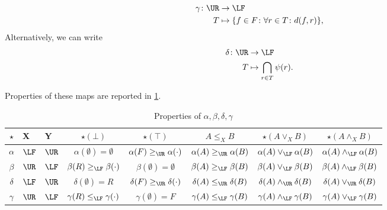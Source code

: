 \begin{equation}
\label{eq:galoisgamma}
    \begin{aligned}
    \gamma \colon \UR&\to \LF\\
    T&\mapsto \{f\in F \colon \forall {r\in T}\colon d(f,r)\},
    \end{aligned}
\end{equation}
Alternatively, we can write
\begin{equation}
    \begin{aligned}
    \delta\colon \UR &\to \LF\\
    T&\mapsto \bigcap_{r\in T}\psi(r).
    \end{aligned}
\end{equation}

\noindent Properties of these maps are reported in \cref{tab:galoisproperties}.


\begin{table}[h!]
    \begin{center}
    \begin{tabular}{c|l|l|c|c|c|c|c}
         $\star$&X&Y&$\star(\bot)$&$\star(\top)$&$A\leq_X B$ &$\star(A\vee_X B)$&$\star(A\wedge_X B)$\\
         \hline
         $\alpha$&$\LF$&$\UR$&$\alpha(\emptyset)=\emptyset$&$\alpha(F)\geq_{\UR} \alpha(\cdot)$&$\alpha(A)\geq_{\UR} \alpha(B)$& $\alpha(A)\vee_{\LF}\alpha(B)$&$\alpha(A)\wedge_{\LF}\alpha(B)$\\
         \hline 
         $\beta$&$\UR$&$\LF$&$\beta(R)\geq_{\LF}\beta(\cdot)$&$\beta(\emptyset)=\emptyset$&$\beta(A)\geq_{\LF} \beta(B)$&$\beta(A)\vee_{\LF}\beta(B)$&$\beta(A)\wedge_{\LF}\beta(B)$\\
         \hline
         $\delta$&$\LF$&$\UR$&$\delta(\emptyset)=R$&$\delta(F)\geq_{\UR}\delta(\cdot)$&$\delta(A)\leq_{\UR} \delta(B)$&$\delta(A)\wedge_{\UR}\delta(B)$&$\delta(A)\vee_{\UR}\delta(B)$\\
         \hline
         $\gamma$&$\UR$&$\LF$&$\gamma(R)\leq_{\LF}\gamma(\cdot)$&$\gamma(\emptyset)=F$&$\gamma(A) \leq_{\LF} \gamma(B)$&$\gamma(A)\wedge_{\LF}\gamma(B)$&$\gamma(A)\vee_{\LF}\gamma(B)$
    \end{tabular}
    \caption{Properties of $\alpha,\beta,\delta,\gamma$}
    \label{tab:galoisproperties}
    \end{center}
\end{table}

